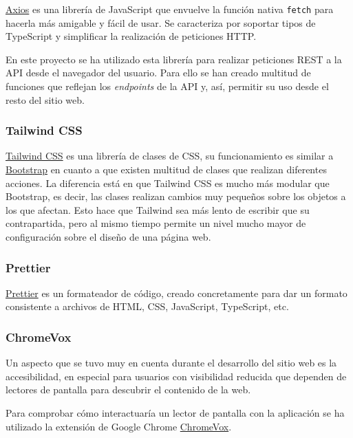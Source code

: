 \href{https://github.com/axios/axios}{Axios} es una librería de JavaScript que
envuelve la función nativa \texttt{fetch} para hacerla más amigable y fácil de
usar. Se caracteriza por soportar tipos de TypeScript y simplificar la
realización de peticiones HTTP.

En este proyecto se ha utilizado esta librería para realizar peticiones REST a
la API desde el navegador del usuario. Para ello se han creado multitud de
funciones que reflejan los \textit{endpoints} de la API y, así, permitir su uso
desde el resto del sitio web.

\subsubsection{Tailwind CSS}

\href{https://tailwindcss.com/}{Tailwind CSS} es una librería de clases de CSS,
su funcionamiento es similar a \href{https://getbootstrap.com/}{Bootstrap} en
cuanto a que existen multitud de clases que realizan diferentes acciones. La
diferencia está en que Tailwind CSS es mucho más modular que Bootstrap, es
decir, las clases realizan cambios muy pequeños sobre los objetos a los que
afectan. Esto hace que Tailwind sea más lento de escribir que su contrapartida,
pero al mismo tiempo permite un nivel mucho mayor de configuración sobre el
diseño de una página web.

\subsubsection{Prettier}

\href{https://prettier.io/}{Prettier} es un formateador de código, creado
concretamente para dar un formato consistente a archivos de HTML, CSS,
JavaScript, TypeScript, etc.

\subsubsection{ChromeVox}

Un aspecto que se tuvo muy en cuenta durante el desarrollo del sitio web es la
accesibilidad, en especial para usuarios con visibilidad reducida que dependen
de lectores de pantalla para descubrir el contenido de la web.

Para comprobar cómo interactuaría un lector de pantalla con la aplicación se ha
utilizado la extensión de Google Chrome
\href{https://chrome.google.com/webstore/detail/screen-reader/kgejglhpjiefppelpmljglcjbhoiplfn}{ChromeVox}.

